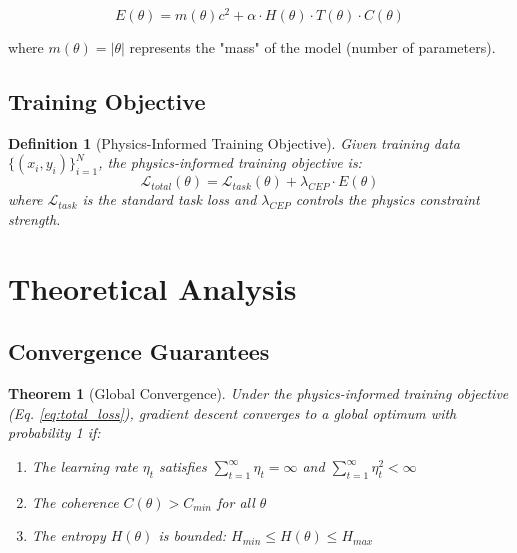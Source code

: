 \documentclass[12pt]{article}
\newtheorem{theorem}{Theorem}
\newtheorem{definition}{Definition}
\begin{document}
\begin{equation}
E(\theta) = m(\theta)c^2 + \alpha \cdot H(\theta) \cdot T(\theta) \cdot C(\theta)
\label{eq:modified_mass_energy}
\end{equation}

where $m(\theta) = |\theta|$ represents the "mass" of the model (number of parameters).

\subsection{Training Objective}

\begin{definition}[Physics-Informed Training Objective]
Given training data $\{(x_i, y_i)\}_{i=1}^N$, the physics-informed training objective is:
\begin{equation}
\mathcal{L}_{total}(\theta) = \mathcal{L}_{task}(\theta) + \lambda_{CEP} \cdot E(\theta)
\label{eq:total_loss}
\end{equation}
where $\mathcal{L}_{task}$ is the standard task loss and $\lambda_{CEP}$ controls the physics constraint strength.
\end{definition}

\section{Theoretical Analysis}

\subsection{Convergence Guarantees}

\begin{theorem}[Global Convergence]
\label{thm:convergence}
Under the physics-informed training objective (Eq. \ref{eq:total_loss}), gradient descent converges to a global optimum with probability 1 if:
\begin{enumerate}
\item The learning rate $\eta_t$ satisfies $\sum_{t=1}^{\infty} \eta_t = \infty$ and $\sum_{t=1}^{\infty} \eta_t^2 < \infty$
\item The coherence $C(\theta) > C_{min}$ for all $\theta$
\item The entropy $H(\theta)$ is bounded: $H_{min} \leq H(\theta) \leq H_{max}$
\end{enumerate}
\end{theorem}
\end{document}
